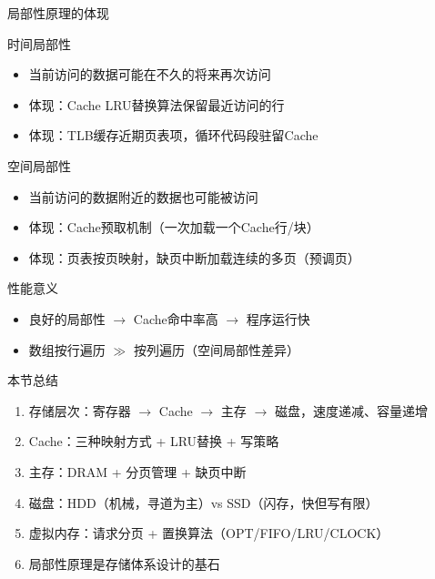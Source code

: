 \documentclass[10pt, aspectratio=169]{beamer}
\begin{document}
\begin{frame}{局部性原理的体现}
    \begin{block}{时间局部性}
        \begin{itemize}
            \item 当前访问的数据可能在不久的将来再次访问
            \item 体现：Cache LRU替换算法保留最近访问的行
            \item 体现：TLB缓存近期页表项，循环代码段驻留Cache
        \end{itemize}
    \end{block}
    \begin{block}{空间局部性}
        \begin{itemize}
            \item 当前访问的数据附近的数据也可能被访问
            \item 体现：Cache预取机制（一次加载一个Cache行/块）
            \item 体现：页表按页映射，缺页中断加载连续的多页（预调页）
        \end{itemize}
    \end{block}
    \begin{block}{性能意义}
        \begin{itemize}
            \item 良好的局部性 $\to$ Cache命中率高 $\to$ 程序运行快
            \item 数组按行遍历 $\gg$ 按列遍历（空间局部性差异）
        \end{itemize}
    \end{block}
\end{frame}

\begin{frame}{本节总结}
    \begin{enumerate}
        \item 存储层次：寄存器 $\to$ Cache $\to$ 主存 $\to$ 磁盘，速度递减、容量递增
        \item Cache：三种映射方式 + LRU替换 + 写策略
        \item 主存：DRAM + 分页管理 + 缺页中断
        \item 磁盘：HDD（机械，寻道为主）vs SSD（闪存，快但写有限）
        \item 虚拟内存：请求分页 + 置换算法（OPT/FIFO/LRU/CLOCK）
        \item 局部性原理是存储体系设计的基石
    \end{enumerate}
\end{frame}
\end{document}
